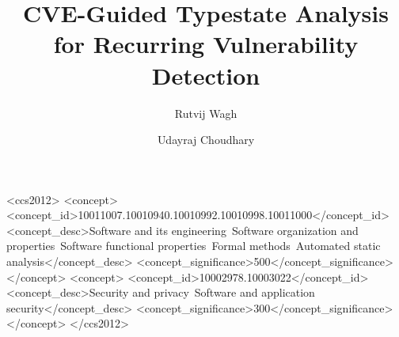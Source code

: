 \documentclass[acmsmall,screen,review,nonacm]{acmart}
\begin{document}
\title[CVE-Guided Typestate Analysis]{CVE-Guided Typestate Analysis for
  Recurring Vulnerability Detection}


\author{Rutvij Wagh}

\author{Udayraj Choudhary}

\begin{abstract}

\end{abstract}

\begin{CCSXML}
<ccs2012>
  <concept>
    <concept_id>10011007.10010940.10010992.10010998.10011000</concept_id>
    <concept_desc>Software and its engineering~Software organization and properties~Software functional properties~Formal methods~Automated static analysis</concept_desc>
    <concept_significance>500</concept_significance>
  </concept>
  <concept>
    <concept_id>10002978.10003022</concept_id>
    <concept_desc>Security and privacy~Software and application security</concept_desc>
    <concept_significance>300</concept_significance>
  </concept>
</ccs2012>
\end{CCSXML}


\maketitle













\end{document}
